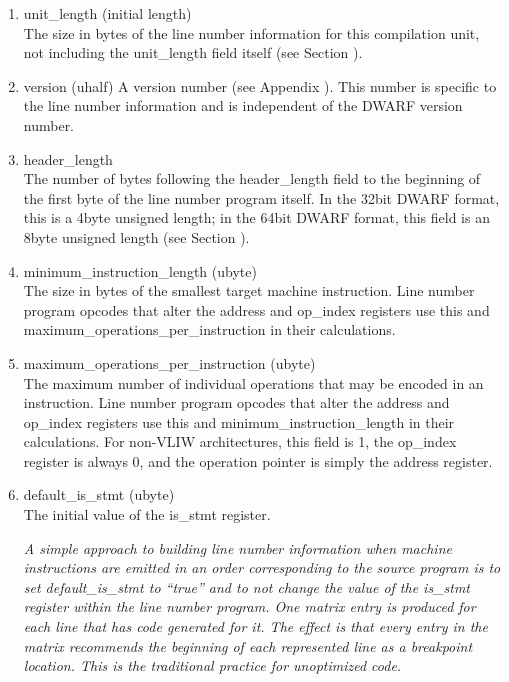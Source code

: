 \begin{enumerate}[1.]
\item unit\_length (initial length)  \\
The size in bytes of the line number information for this
compilation unit, not including the unit\_length field itself
(see Section ). 

\item version (uhalf) 
A version number 
(see Appendix ). 
This number is specific to
the line number information and is independent of the DWARF
version number. 

\item header\_length  \\
The number of bytes following the header\_length field to the
beginning of the first byte of the line number program itself.
In the 32\dash bit DWARF format, this is a 4\dash byte unsigned
length; in the 64\dash bit DWARF format, this field is an
8\dash byte unsigned length 
(see Section ). 

\item minimum\_instruction\_length (ubyte)  \\
The size in bytes of the smallest target machine
instruction. Line number program opcodes that alter
the address and op\_index registers use this and
maximum\-\_operations\-\_per\-\_instruction in their calculations. 

\item maximum\_operations\_per\_instruction (ubyte) \\
The maximum number of individual operations that may be
encoded in an instruction. Line number program opcodes
that alter the address and op\_index registers use this and
minimum\_instruction\_length in their calculations.  For non-VLIW
architectures, this field is 1, the op\_index register is always
0, and the operation pointer is simply the address register.

\item default\_is\_stmt (ubyte) \\
The initial value of the is\_stmt register.  

\textit{A simple approach
to building line number information when machine instructions
are emitted in an order corresponding to the source program
is to set default\_is\_stmt to ``true'' and to not change the
value of the is\_stmt register within the line number program.
One matrix entry is produced for each line that has code
generated for it. The effect is that every entry in the
matrix recommends the beginning of each represented line as
a breakpoint location. This is the traditional practice for
unoptimized code.}


\end{enumerate}
